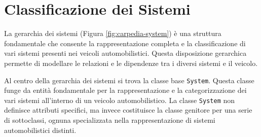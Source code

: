 \begin{figure}[H]
    \label{fig:carpedia-component}
\end{figure}

\section{Classificazione dei Sistemi}

La gerarchia dei sistemi (Figura \ref{fig:carpedia-system}) è una struttura fondamentale che consente la rappresentazione completa e la classificazione di vari sistemi presenti nei veicoli automobilistici. Questa disposizione gerarchica permette di modellare le relazioni e le dipendenze tra i diversi sistemi e il veicolo.

Al centro della gerarchia dei sistemi si trova la classe base \texttt{System}. Questa classe funge da entità fondamentale per la rappresentazione e la categorizzazione dei vari sistemi all'interno di un veicolo automobilistico. La classe \texttt{System} non definisce attributi specifici, ma invece costituisce la classe genitore per una serie di sottoclassi, ognuna specializzata nella rappresentazione di sistemi automobilistici distinti.

